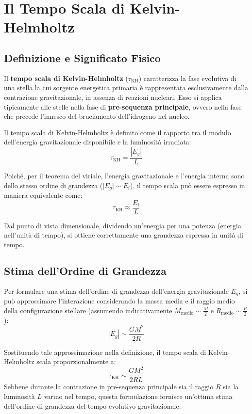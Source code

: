 \section{Il Tempo Scala di Kelvin-Helmholtz}

\subsection{Definizione e Significato Fisico}
Il \textbf{tempo scala di Kelvin-Helmholtz} ($\tau_{\text{KH}}$) caratterizza la fase evolutiva di una stella la cui sorgente energetica primaria è rappresentata esclusivamente dalla contrazione gravitazionale, in assenza di reazioni nucleari. Esso si applica tipicamente alle stelle nella fase di \textbf{pre-sequenza principale}, ovvero nella fase che precede l'innesco del bruciamento dell'idrogeno nel nucleo.

Il tempo scala di Kelvin-Helmholtz è definito come il rapporto tra il modulo dell'energia gravitazionale disponibile e la luminosità irradiata:
\begin{equation}
\tau_{\text{KH}} = \frac{|E_g|}{L}
\end{equation}

Poiché, per il teorema del viriale, l'energia gravitazionale e l'energia interna sono dello stesso ordine di grandezza ($\vert{}E_g\vert{} \sim E_i$), il tempo scala può essere espresso in maniera equivalente come:
\begin{equation}
\tau_{\text{KH}} \approx \frac{E_i}{L}
\end{equation}

Dal punto di vista dimensionale, dividendo un'energia per una potenza (energia nell'unità di tempo), si ottiene correttamente una grandezza espressa in unità di tempo.

\subsection{Stima dell'Ordine di Grandezza}
Per formulare una stima dell'ordine di grandezza dell'energia gravitazionale $E_g$, si può approssimare l'interazione considerando la massa media e il raggio medio della configurazione stellare (assumendo indicativamente $M_{\text{medio}} \sim \frac{M}{2}$ e $R_{\text{medio}} \sim \frac{R}{2}$):
\begin{equation}
|E_g| \sim \frac{G M^2}{2R}
\end{equation}

Sostituendo tale approssimazione nella definizione, il tempo scala di Kelvin-Helmholtz scala proporzionalmente a:
\begin{equation}
\tau_{\text{KH}} \sim \frac{G M^2}{2 R L}
\end{equation}
Sebbene durante la contrazione in pre-sequenza principale sia il raggio $R$ sia la luminosità $L$ varino nel tempo, questa formulazione fornisce un'ottima stima dell'ordine di grandezza del tempo evolutivo gravitazionale.

